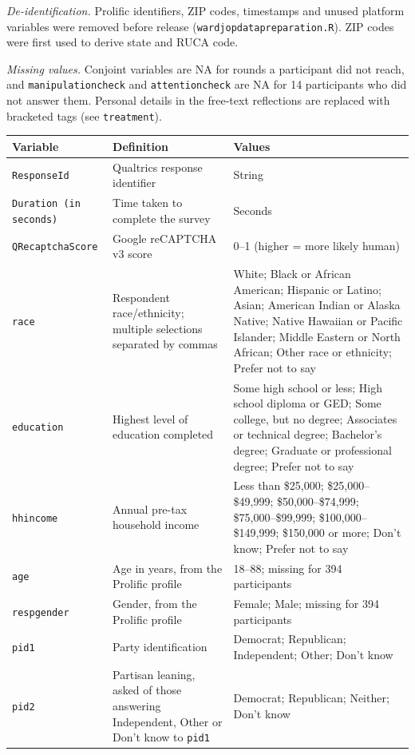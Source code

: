 \documentclass[11pt]{article}
\renewcommand{\_}{\oldunderscore\allowbreak}
\begin{document}
\emph{De-identification.} Prolific identifiers, ZIP codes, timestamps and unused platform variables were removed before release (\texttt{ward\_jop\_data\_preparation.R}). ZIP codes were first used to derive state and RUCA code.

\emph{Missing values.} Conjoint variables are NA for rounds a participant did not reach, and \texttt{manipulation\_check\_1} and \texttt{attention\_check} are NA for 14 participants who did not answer them. Personal details in the free-text reflections are replaced with bracketed tags (see \texttt{treatment}).

\begin{longtable}{L{3.6cm}L{6.6cm}L{4.8cm}}
\toprule
\textbf{Variable} & \textbf{Definition} & \textbf{Values} \\
\midrule
\endhead
\bottomrule
\endfoot
\texttt{ResponseId} & Qualtrics response identifier & String \\
\texttt{Duration (in seconds)} & Time taken to complete the survey & Seconds \\
\texttt{Q\_RecaptchaScore} & Google reCAPTCHA v3 score & 0--1 (higher = more likely human) \\
\texttt{race} & Respondent race/ethnicity; multiple selections separated by commas & White; Black or African American; Hispanic or Latino; Asian; American Indian or Alaska Native; Native Hawaiian or Pacific Islander; Middle Eastern or North African; Other race or ethnicity; Prefer not to say \\
\texttt{education} & Highest level of education completed & Some high school or less; High school diploma or GED; Some college, but no degree; Associates or technical degree; Bachelor's degree; Graduate or professional degree; Prefer not to say \\
\texttt{hh\_income} & Annual pre-tax household income & Less than \$25,000; \$25,000--\$49,999; \$50,000--\$74,999; \$75,000--\$99,999; \$100,000--\$149,999; \$150,000 or more; Don't know; Prefer not to say \\
\texttt{age} & Age in years, from the Prolific profile & 18--88; missing for 394 participants \\
\texttt{resp\_gender} & Gender, from the Prolific profile & Female; Male; missing for 394 participants \\
\texttt{pid1} & Party identification & Democrat; Republican; Independent; Other; Don't know \\
\texttt{pid2} & Partisan leaning, asked of those answering Independent, Other or Don't know to \texttt{pid1} & Democrat; Republican; Neither; Don't know \\

\end{longtable}
\end{document}
